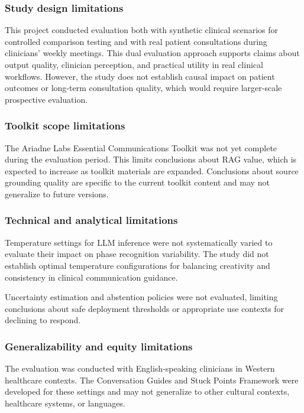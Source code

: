 \subsubsection{Study design limitations}

This project conducted evaluation both with synthetic clinical scenarios for controlled comparison testing and with real patient consultations during clinicians' weekly meetings. This dual evaluation approach supports claims about output quality, clinician perception, and practical utility in real clinical workflows. However, the study does not establish causal impact on patient outcomes or long-term consultation quality, which would require larger-scale prospective evaluation.

\subsubsection{Toolkit scope limitations}

The Ariadne Labs Essential Communications Toolkit was not yet complete during the evaluation period. This limits conclusions about RAG value, which is expected to increase as toolkit materials are expanded. Conclusions about source grounding quality are specific to the current toolkit content and may not generalize to future versions.

\subsubsection{Technical and analytical limitations}

Temperature settings for LLM inference were not systematically varied to evaluate their impact on phase recognition variability. The study did not establish optimal temperature configurations for balancing creativity and consistency in clinical communication guidance.

Uncertainty estimation and abstention policies were not evaluated, limiting conclusions about safe deployment thresholds or appropriate use contexts for declining to respond.

\subsubsection{Generalizability and equity limitations}

The evaluation was conducted with English-speaking clinicians in Western healthcare contexts. The Conversation Guides and Stuck Points Framework were developed for these settings and may not generalize to other cultural contexts, healthcare systems, or languages.

